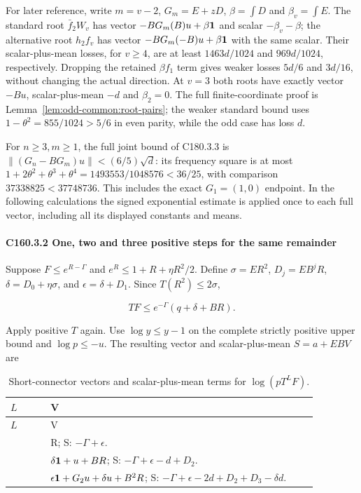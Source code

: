 For later reference, write $m=v-2$, $G_m=E+zD$, $\beta=\int D$ and $\beta_v=\int E$. The standard root $\bar f_2W_v$ has vector $-BG_m(B)u+\beta\mathbf1$ and scalar $-\beta_v-\beta$; the alternative root $h_2f_v$ has vector $-BG_m(-B)u+\beta\mathbf1$ with the same scalar. Their scalar-plus-mean losses, for $v\ge4$, are at least $1463d/1024$ and $969d/1024$, respectively. Dropping the retained $\beta f_1$ term gives weaker losses $5d/6$ and $3d/16$, without changing the actual direction. At $v=3$ both roots have exactly vector $-Bu$, scalar-plus-mean $-d$ and $\beta_2=0$. The full finite-coordinate proof is Lemma~\ref{lem:odd-common:root-pairs}; the weaker standard bound uses $1-\theta^2=855/1024>5/6$ in even parity, while the odd case has loss $d$.

For $n\ge3,m\ge1$, the full joint bound of C180.3.3 is $\|(G_n-BG_m)u\|<(6/5)\sqrt d$: its frequency square is at most $1+2\theta^2+\theta^3+\theta^4=1493553/1048576<36/25$, with comparison $37338825<37748736$. This includes the exact $G_1=(1,0)$ endpoint. In the following calculations the signed exponential estimate is applied once to each full vector, including all its displayed constants and means.

\paragraph{C160.3.2 One, two and three positive steps for the same remainder}

Suppose \(F\le e^{R-\Gamma}\) and \(e^R\le1+R+\eta R^2/2\). Define \(\sigma=ER^2\), \(D_j=EB^jR\), \(\delta=D_0+\eta\sigma\), and \(\epsilon=\delta+D_1\). Since \(T(R^2)\le2\sigma\),

\[
TF\le e^{-\Gamma}(q+\delta+BR).
\]

Apply positive \(T\) again. Use \(\log y\le y-1\) on the complete strictly positive upper bound and \(\log p\le-u\). The resulting vector and scalar-plus-mean \(S=a+EBV\) are


\begingroup\small
\setlength{\tabcolsep}{3pt}
\setlength{\LTleft}{0pt}\setlength{\LTright}{\fill}
\begin{longtable}{@{}>{\raggedright\arraybackslash}p{0.1200\linewidth}>{\raggedright\arraybackslash}p{0.8000\linewidth}@{}}
\caption{Short-connector vectors and scalar-plus-mean terms for \(\log(pT^LF)\).}\label{tab:parameters:q5-c160:2}\\
\toprule
\(L\) & V \\
\midrule\endfirsthead
\toprule
\(L\) & V \\
\midrule\endhead
\bottomrule\endfoot
1 & R; S: \(-\Gamma+\epsilon\). \\
\addlinespace[2pt]
2 & \(\delta\mathbf1+u+BR\); S: \(-\Gamma+\epsilon-d+D_2\). \\
\addlinespace[2pt]
3 & \(\epsilon\mathbf1+G_2u+\delta u+B^2R\); S: \(-\Gamma+\epsilon-2d+D_2+D_3-\delta d\). \\
\end{longtable}
\endgroup


